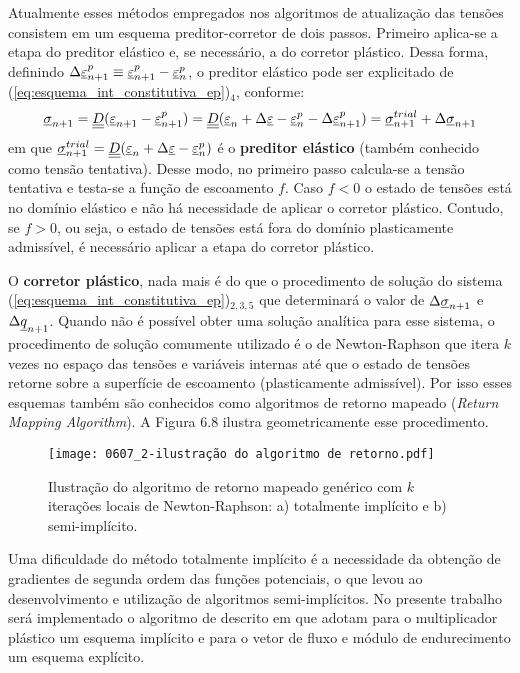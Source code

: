 Atualmente esses métodos empregados nos algoritmos de atualização das tensões consistem em um esquema preditor-corretor de dois passos. Primeiro aplica-se a etapa do preditor elástico e, se necessário, a do corretor plástico. Dessa forma, definindo $\Delta \underline{\varepsilon}_{n+1}^p \equiv \underline{\varepsilon}_{n+1}^p - \underline{\varepsilon}_{n}^p$, o preditor elástico pode ser explicitado de (\ref{eq:esquema_int_constitutiva_ep})$_4$, conforme:
\begin{equation}
	\label{eq:preditor_elastico}
	\underline \sigma_{n+1} = \underline{\underline D}(\underline{\varepsilon}_{n+1}-\underline{\varepsilon}_{n+1}^p) = \underline{\underline D}(\underline{\varepsilon}_n+\Delta \underline{\varepsilon}-\underline{\varepsilon}_{n}^ p-\Delta \underline{\varepsilon}_{n+1}^p) = \underline \sigma_{n+1}^{trial} + \Delta \underline \sigma_{n+1}
\end{equation}
em que $\underline \sigma_{n+1}^{trial} = \underline{\underline D}(\underline{\varepsilon}_n+\Delta \underline{\varepsilon}-\underline{\varepsilon}_{n}^ p)$ é o \textbf{preditor elástico} (também conhecido como tensão tentativa). Desse modo, no primeiro passo calcula-se a tensão tentativa e testa-se a função de escoamento $f$. Caso $f<0$ o estado de tensões está no domínio elástico e não há necessidade de aplicar o corretor plástico. Contudo, se $f>0$, ou seja, o estado de tensões está fora do domínio plasticamente admissível, é necessário aplicar a etapa do corretor plástico.

O \textbf{corretor plástico}, nada mais é do que o procedimento de solução do sistema (\ref{eq:esquema_int_constitutiva_ep})$_{2,3,5}$ que determinará o valor de $\Delta \underline \sigma_{n+1}$ e $\Delta \underline q_{n+1}$. Quando não é possível obter uma solução analítica para esse sistema, o procedimento de solução comumente utilizado é o de Newton-Raphson que itera $k$ vezes no espaço das tensões e variáveis internas até que o estado de tensões retorne sobre a superfície de escoamento (plasticamente admissível). Por isso esses esquemas também são conhecidos como algoritmos de retorno mapeado (\textit{Return Mapping Algorithm}). A Figura 6.8 ilustra geometricamente esse procedimento.

\begin{figure}[H]
	\begin{center}
		\texttt{[image: 0607\_2-ilustração do algoritmo de retorno.pdf]}
	\end{center}
	\caption{\label{algoritmo_retorno}Ilustração do algoritmo de retorno mapeado genérico com $k$ iterações locais de Newton-Raphson: a) totalmente implícito e b) semi-implícito.}
\end{figure}

Uma dificuldade do método totalmente implícito é a necessidade da obtenção de gradientes de segunda ordem das funções potenciais, o que levou ao desenvolvimento e utilização de algoritmos semi-implícitos. No presente trabalho será implementado o algoritmo de  descrito em  que adotam para o multiplicador plástico um esquema implícito e para o vetor de fluxo e módulo de endurecimento um esquema explícito.

